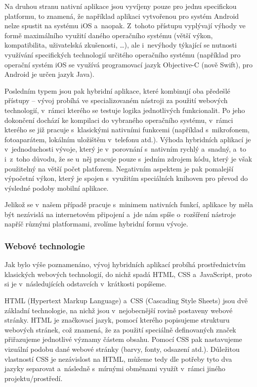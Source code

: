 Na druhou stranu nativní aplikace jsou vyvíjeny pouze pro jednu
specifickou platformu, to znamená, že například aplikaci vytvořenou pro
systém Android nelze spustit na systému iOS a~naopak. Z~tohoto přístupu
vyplývají výhody ve formě maximálního využití daného operačního systému
(větší výkon, kompatibilita, uživatelská zkušenosti, \ldots{}), ale
i~nevýhody týkající se nutnosti využívání specifických technologií
určitého operačního systému (například pro operační systém iOS se
využívá programovací jazyk Objective-C (nově Swift), pro Android je
určen jazyk Java).

Posledním typem jsou pak hybridní aplikace, které kombinují oba předešlé
přístupy -- vývoj probíhá ve specializovaném nástroji za použití
webových technologií, v~rámci kterého se testuje logika jednotlivých
funkcionalit. Po jeho dokončení dochází ke kompilaci do vybraného
operačního systému, v~rámci kterého se již pracuje s~klasickými
nativními funkcemi (například s~mikrofonem, fotoaparátem, lokálním
uložištěm v~telefonu atd.). Výhoda hybridních aplikací je
v~jednoduchosti vývoje, který je v~porovnání s~nativním rychlý a~snadný,
a~to i~z~toho důvodu, že se u~něj pracuje pouze s~jedním zdrojem kódu,
který je však použitelný na větší počet platforem. Negativním aspektem
je pak pomalejší výpočetní výkon, který je spojen s~využitím speciálních
knihoven pro převod do výsledné podoby mobilní aplikace.

Jelikož se v~našem případě pracuje s~minimem nativních funkcí, aplikace
by měla být nezávislá na internetovém připojení a~jde nám spíše
o~rozšíření nástroje napříč různými platformami, zvolíme hybridní formu
vývoje.

\hypertarget{webovuxe9-technologie}{%
\subsubsection{Webové technologie}\label{webovuxe9-technologie}}

Jak bylo výše poznamenáno, vývoj hybridních aplikací probíhá
prostřednictvím klasických webových technologií, do nichž spadá HTML,
CSS a~JavaScript, proto si je v~následujících odstavcích v~krátkosti
popíšeme.

HTML (Hypertext Markup Language) a~CSS (Cascading Style Sheets) jsou dvě
základní technologie, na nichž jsou v~nejobecnější rovině postaveny
webové stránky. HTML je značkovací jazyk, pomocí kterého popisujeme
strukturu webových stránek, což znamená, že za použití speciálně
definovaných značek přiřazujeme jednotlivé významy částem obsahu. Pomocí
CSS pak nastavujeme vizuální podobu dané webové stránky (barvy, fonty,
odsazení atd.). Důležitou vlastností CSS je nezávislost na HTML, můžeme
tedy dle potřeby tyto dva jazyky separovat a~následně s~mírnými obměnami
využít v~rámci jiného projektu/prostředí.~\parencite{htmlcss}

